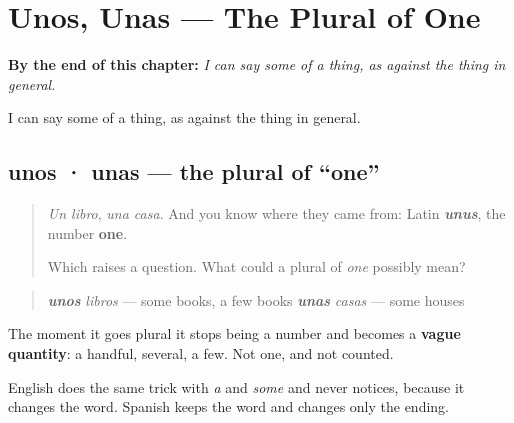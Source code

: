 
\chapter{Unos, Unas --- The Plural of One}
\label{ch:unos-unas}

\begin{chapteropening}
\textbf{By the end of this chapter:} \emph{I can say some of a thing, as against the thing in general.}

I can say some of a thing, as against the thing in general.
\end{chapteropening}

\section[unos · unas]{unos · unas — the plural of \textquotedblleft{}one\textquotedblright{}}

\label{lesson:ES-C65-unos-unas}



\begin{quote}
\emph{Un libro}, \emph{una casa}. And you know where they came from: Latin \emph{\textbf{unus}}, the number \textbf{one}.

Which raises a question. What could a plural of \emph{one} possibly mean?
\end{quote}

\begin{grammarlens}[title={Grammar Lens: it stops meaning one}]
\begin{quote}
\emph{\textbf{unos}} \emph{libros} — some books, a few books \emph{\textbf{unas}} \emph{casas} — some houses
\end{quote}

The moment it goes plural it stops being a number and becomes a \textbf{vague quantity}: a handful, several, a few. Not one, and not counted.

English does the same trick with \emph{a} and \emph{some} and never notices, because it changes the word. Spanish keeps the word and changes only the ending.
\end{grammarlens}

